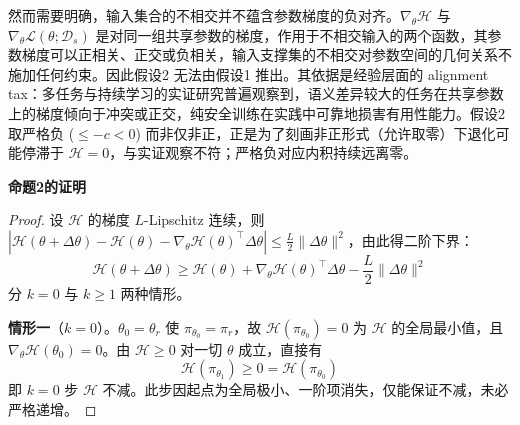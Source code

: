 \documentclass[lettersize,journal]{IEEEtran}
\begin{document}
然而需要明确，输入集合的不相交并不蕴含参数梯度的负对齐。$\nabla_\theta \mathcal{H}$ 与 $\nabla_\theta \mathcal{L}(\theta; \mathcal{D}_s)$ 是对同一组共享参数的梯度，作用于不相交输入的两个函数，其参数梯度可以正相关、正交或负相关，输入支撑集的不相交对参数空间的几何关系不施加任何约束。因此假设2 无法由假设1 推出。其依据是经验层面的 alignment tax：多任务与持续学习的实证研究普遍观察到，语义差异较大的任务在共享参数上的梯度倾向于冲突或正交\cite{yu2020gradient, kirkpatrick2017overcoming}，纯安全训练在实践中可靠地损害有用性能力。假设2 取严格负 ($\leq -c < 0$) 而非仅非正，正是为了刻画非正形式（允许取零）下退化可能停滞于 $\mathcal{H} = 0$，与实证观察不符；严格负对应内积持续远离零。
 
\textbf{命题2的证明}
\begin{proof}
设 $\mathcal{H}$ 的梯度 $L$-Lipschitz 连续，则 $|\mathcal{H}(\theta+\Delta\theta) - \mathcal{H}(\theta) - \nabla_\theta\mathcal{H}(\theta)^\top\Delta\theta| \leq \frac{L}{2}\|\Delta\theta\|^2$，由此得二阶下界：
\begin{equation}\label{eq:descent-lemma}
    \mathcal{H}(\theta + \Delta\theta) \geq \mathcal{H}(\theta) 
    + \nabla_\theta \mathcal{H}(\theta)^\top \Delta\theta 
    - \frac{L}{2}\|\Delta\theta\|^2
\end{equation}
分 $k = 0$ 与 $k \geq 1$ 两种情形。
 
\textbf{情形一}（$k = 0$）。$\theta_0 = \theta_r$ 使 $\pi_{\theta_0} = \pi_r$，故 $\mathcal{H}(\pi_{\theta_0}) = 0$ 为 $\mathcal{H}$ 的全局最小值，且 $\nabla_\theta \mathcal{H}(\theta_0) = 0$。由 $\mathcal{H} \geq 0$ 对一切 $\theta$ 成立，直接有
\begin{equation}
    \mathcal{H}(\pi_{\theta_1}) \geq 0 = \mathcal{H}(\pi_{\theta_0})
\end{equation}
即 $k = 0$ 步 $\mathcal{H}$ 不减。此步因起点为全局极小、一阶项消失，仅能保证不减，未必严格递增。
 

\end{proof}
\end{document}
